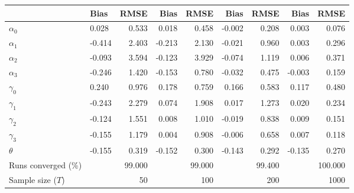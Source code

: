 
\begin{tabular}[t]{llrrrrrrr}
\toprule
  & Bias & RMSE & Bias & RMSE & Bias & RMSE & Bias & RMSE\\
\midrule
$\alpha_{0}$ & 0.028 & 0.533 & 0.018 & 0.458 & -0.002 & 0.208 & 0.003 & 0.076\\
$\alpha_{1}$ & -0.414 & 2.403 & -0.213 & 2.130 & -0.021 & 0.960 & 0.003 & 0.296\\
$\alpha_{2}$ & -0.093 & 3.594 & -0.123 & 3.929 & -0.074 & 1.119 & 0.006 & 0.371\\
$\alpha_{3}$ & -0.246 & 1.420 & -0.153 & 0.780 & -0.032 & 0.475 & -0.003 & 0.159\\
$\gamma_{0}$ & 0.240 & 0.976 & 0.178 & 0.759 & 0.166 & 0.583 & 0.117 & 0.480\\
$\gamma_{1}$ & -0.243 & 2.279 & 0.074 & 1.908 & 0.017 & 1.273 & 0.020 & 0.234\\
$\gamma_{2}$ & -0.124 & 1.551 & 0.008 & 1.010 & -0.019 & 0.838 & 0.009 & 0.151\\
$\gamma_{3}$ & -0.155 & 1.179 & 0.004 & 0.908 & -0.006 & 0.658 & 0.007 & 0.118\\
$\theta$ & -0.155 & 0.319 & -0.152 & 0.300 & -0.143 & 0.292 & -0.135 & 0.270\\
Runs converged (\%) &  & 99.000 &  & 99.000 &  & 99.400 &  & 100.000\\
Sample size ($T$) &  & 50 &  & 100 &  & 200 &  & 1000\\
\bottomrule
\end{tabular}
